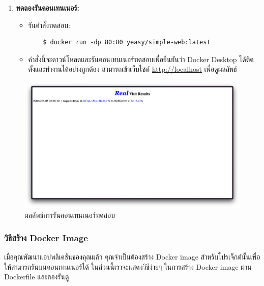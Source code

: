 \begin{enumerate}
      \item \textbf{ทดลองรันคอนเทนเนอร์:}
            \begin{itemize}
                  \item รันคำสั่งทดสอบ:
                        \begin{verbatim}
    $ docker run -dp 80:80 yeasy/simple-web:latest
            \end{verbatim}
                  \item คำสั่งนี้จะดาวน์โหลดและรันคอนเทนเนอร์ทดสอบเพื่อยืนยันว่า Docker Desktop ได้ติดตั้งและทำงานได้อย่างถูกต้อง สามารถเข้าเว็บไซต์ \url{http://localhost} เพื่อดูผลลัพธ์
            \end{itemize}
\end{enumerate}
\begin{figure}[ht]
      \begin{center}
            \includegraphics[scale=0.2]{images/simpleDockerRunResult.png}
      \end{center}
      \caption[ผลลัพธ์การรันคอนเทนเนอร์ทดสอบ]{ผลลัพธ์การรันคอนเทนเนอร์ทดสอบ}
\end{figure}

\clearpage
\subsubsection{วิธีสร้าง Docker Image}

เมื่อคุณพัฒนาแอปพลิเคชันของคุณแล้ว คุณจำเป็นต้องสร้าง Docker image สำหรับโปรเจ็กต์นั้นเพื่อให้สามารถรันบนคอนเทนเนอร์ได้ ในส่วนนี้เราจะแสดงวิธีง่ายๆ ในการสร้าง Docker image ผ่าน Dockerfile และลองรันดู

